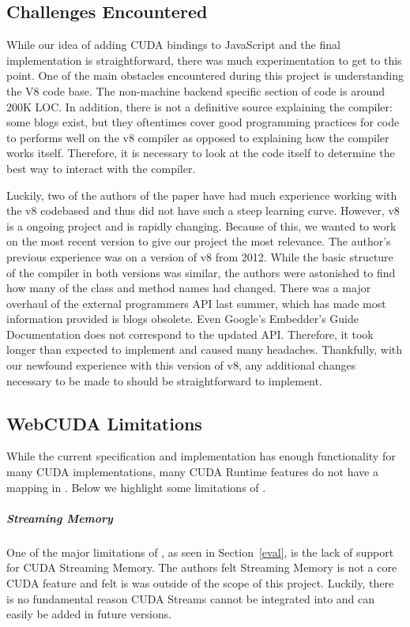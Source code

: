 
\subsection{Challenges Encountered}
\label{challenges}
While our idea of adding CUDA bindings to JavaScript and the final
implementation is straightforward, there was much experimentation to get to this point.
One of the main obstacles encountered during this project is understanding the
V8 code base. The non-machine backend specific section of code is around 200K
LOC. In addition, there is not a definitive source explaining the compiler: some
blogs exist, but they oftentimes cover good programming practices for code to
performs well on the v8 compiler as opposed to explaining how the compiler works
itself. Therefore, it is necessary to look at the code itself to determine the
best way to interact with the compiler.

Luckily, two of the authors of the paper have had much experience working with
the v8 codebased and thus did not have such a steep learning curve. However, v8
is a ongoing project and is rapidly changing. Because of this, we wanted to work
on the most recent version to give our project the most relevance. The author's
previous experience was on a version of v8 from 2012. While the basic structure
of the compiler in both versions was similar, the authors were astonished to
find how many of the class and method names had changed. There was a major
overhaul of the external programmers API last summer, which has made most
information provided is blogs obsolete. Even Google's Embedder's Guide
Documentation \cite{embeddersGuide} does not correspond to the updated API.
Therefore, it took longer than expected to implement \name and caused many
headaches. Thankfully, with our newfound experience with this version of v8, any
additional changes necessary to be made to \name should be straightforward to
implement.

\subsection{WebCUDA Limitations}
While the current \name specification and implementation has enough
functionality for many CUDA implementations, many CUDA Runtime features do not
have a mapping in \namens. Below we highlight some limitations of \namens.

\subparagraph{Streaming Memory} One of the major limitations of \namens, as seen
in Section~\ref{eval}, is the lack of support for CUDA Streaming Memory. The
authors felt Streaming Memory is not a core CUDA feature and felt is was outside
of the scope of this project.  Luckily, there is no fundamental reason CUDA
Streams cannot be integrated into \name and can easily be added in future
versions.

